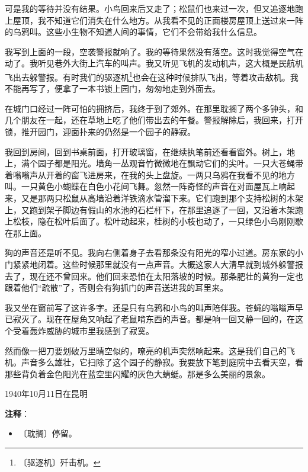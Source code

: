 \documentclass[12pt,UTF-8,openany]{ctexbook}
\begin{document}
\begin{normalsize}
    可是我的等待并没有结果。小鸟回来后又走了；松鼠们也来过一次，但又追逐地跑上屋顶，我不知道它们消失在什么地方。从我看不见的正面楼房屋顶上送过来一阵的乌鸦叫。这些小生物不知道人间的事情，它们不会带给我什么信息。
    
    我写到上面的一段，空袭警报就响了。我的等待果然没有落空。这时我觉得空气在动了。我听见巷外大街上汽车的叫声。我又听见飞机的发动机声，这大概是民航机飞出去躲警报。有时我们的驱逐机\footnote{〔驱逐机〕歼击机。}也会在这种时候排队飞出，等着攻击敌机。我不能再写了，便拿了一本书锁上园门，匆匆地走到外面去。
    
    在城门口经过一阵可怕的拥挤后，我终于到了郊外。在那里耽搁了两个多钟头，和几个朋友在一起，还在草地上吃了他们带出去的午餐。警报解除后，我回来，打开锁，推开园门，迎面扑来的仍然是一个园子的静寂。
    
    我回到房间，回到书桌前面，打开玻璃窗，在继续执笔前还看看窗外。树上，地上，满个园子都是阳光。墙角一丛观音竹微微地在飘动它们的尖叶。一只大苍蝇带着嗡嗡声从开着的窗飞进房来，在我的头上盘旋。一两只乌鸦在我看不见的地方叫。一只黄色小蝴蝶在白色小花间飞舞。忽然一阵奇怪的声音在对面屋瓦上响起来，又是那两只松鼠从高墙沿着洋铁滴水管溜下来。它们跑到那个支持松树的木架上，又跑到架子脚边有假山的水池的石栏杆下，在那里追逐了一回，又沿着木架跑上松枝，隐在松叶后面了。松叶动起来，桂树的小枝也动了，一只绿色小鸟刚刚歇在那上面。
    
    狗的声音还是听不见。我向右侧着身子去看那条没有阳光的窄小过道。房东家的小门紧紧地闭着。这些时候那里就没有一点声音。大概这家人大清早就到城外躲警报去了，现在还不曾回来。他们回来恐怕在太阳落坡的时候。那条肥壮的黄狗一定也跟着他们“疏散”了，否则会有狗抓门的声音送进我的耳里来。
    
    我又坐在窗前写了这许多字。还是只有乌鸦和小鸟的叫声陪伴我。苍蝇的嗡嗡声早已寂灭了。现在在屋角又响起了老鼠啃东西的声音。都是响一回又静一回的，在这个受着轰炸威胁的城市里我感到了寂寞。
    
    然而像一把刀要划破万里晴空似的，嘹亮的机声突然响起来。这是我们自己的飞机。声音多么雄壮，它扫除了这个园子的静寂。我要放下笔到庭院中去看天空，看那些背负着金色阳光在蓝空里闪耀的灰色大蜻蜓。那是多么美丽的景象。
    
    \hfill 1940年10月11日在昆明
    
\end{normalsize}


\newpage

\textbf{注释}：

\vspace{-1em}

\begin{itemize}
    \setlength\itemsep{-0.2em}
    \item 〔耽搁〕停留。
\end{itemize}
\end{document}
